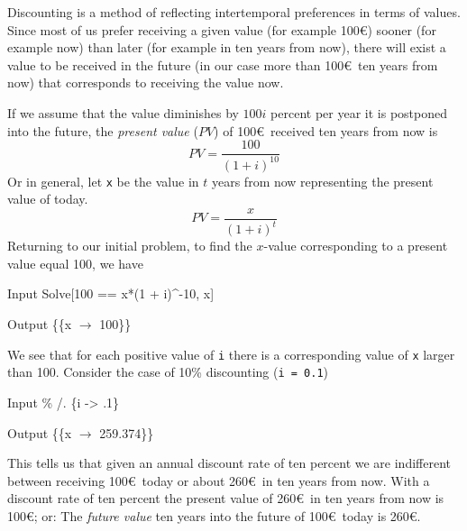 \documentclass[11pt,fleqn]{book} %
\begin{document}
\begin{theorem}[Discounting] 
\hfill \break
Discounting is a method of reflecting intertemporal preferences in terms of values. Since most of us prefer receiving a given value (for example 100\euro) sooner (for example now) than later (for example in ten years from now), there will exist a value to be received in the future (in our case more than 100\euro \ ten years from now) that corresponds to receiving the value now.

If we assume that the value diminishes by $100 i$ percent per year it is postponed into the future, the \textit{present value} ($PV$) of 100\euro \ received ten years from now is
\begin{equation*} 
 PV = \frac{100}{(1 + i)^{10}}
\end{equation*}
Or in general, let \texttt{x} be the value in $t$ years from now representing the present value of today.
\begin{equation*} 
 PV = \frac{x}{(1 + i)^t}
\end{equation*}
Returning to our initial problem, to find the $x$-value corresponding to a present value equal 100, we have
 
\begin{mmaCell}[index=1]{Input}
  Solve[100 == x*(1 + i)^-10, x]
\end{mmaCell}
\begin{mmaCell}{Output}
  \big\{\big\{x \(\to\) 100\big\}\big\}
\end{mmaCell}
We see that for each positive value of \texttt{i} there is a corresponding value of \texttt{x} larger than 100. Consider the case of 10\% discounting (\texttt{i = 0.1})
\begin{mmaCell}{Input}
  \% /. \{i -> .1\}
\end{mmaCell}
\begin{mmaCell}{Output}
  \{\{x \(\to\) 259.374\}\}
\end{mmaCell}
This tells us that given an annual discount rate of ten percent we are indifferent between receiving 100\euro \ today or about 260\euro \ in ten years from now. With a discount rate of ten percent the present value of 260\euro \ in ten years from now is 100\euro; or: The \textit{future value} ten years into the future of 100\euro \ today is 260\euro.


\end{theorem}
\end{document}
